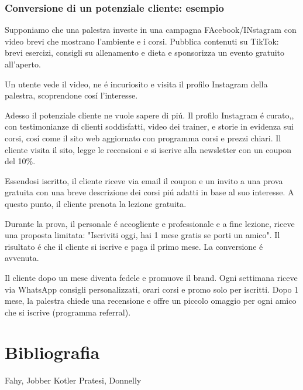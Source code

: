 \documentclass{article}
\begin{document}
\subsubsection{Conversione di un potenziale cliente: esempio}
Supponiamo che una palestra investe in una campagna FAcebook/INstagram con video brevi che mostrano l'ambiente e i corsi. Pubblica contenuti su TikTok: brevi esercizi, consigli su allenamento e dieta e sponsorizza un evento gratuito all'aperto. 

Un utente vede il video, ne \'e incuriosito e visita il profilo Instagram della palestra, scoprendone cos\'i l'interesse.

Adesso il potenziale cliente ne vuole sapere di pi\'u. Il profilo Instagram \'e curato,, con testimonianze di clienti soddisfatti, video dei trainer, e storie in evidenza sui corsi, cos\'i come il sito web aggiornato con programma corsi e prezzi chiari. Il cliente visita il sito, legge le recensioni e si iscrive alla newsletter con un coupon del 10\%.

Essendosi iscritto, il cliente riceve via email il coupon e un invito a una prova gratuita con una breve descrizione dei corsi pi\'u adatti in base al suo interesse. A questo punto, il cliente prenota la lezione gratuita. 

Durante la prova, il personale \'e accogliente e professionale e a fine lezione, riceve una proposta limitata: "Iscriviti oggi, hai 1 mese gratis se porti un amico". Il risultato \'e che il cliente si iscrive e paga il primo mese. La conversione \'e avvenuta.

Il cliente dopo un mese diventa fedele e promuove il brand. Ogni settimana riceve via WhatsApp consigli personalizzati, orari corsi e promo solo per iscritti. Dopo 1 mese, la palestra chiede una recensione e offre un piccolo omaggio per ogni amico che si iscrive (programma referral).

\section{Bibliografia}
Fahy, Jobber
Kotler
Pratesi, Donnelly
\end{document}
